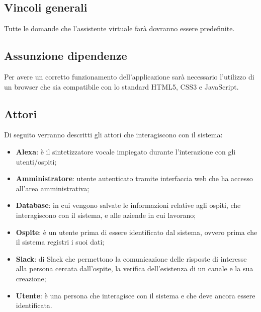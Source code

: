 \documentclass[../AnalisiDeiRequisiti.tex]{subfiles}
\begin{document}
	\subsection{Vincoli generali}
	Tutte le domande che l'assistente virtuale farà dovranno essere predefinite.
	\subsection{Assunzione dipendenze}
	Per avere un corretto funzionamento dell'applicazione sarà necessario l'utilizzo di un browser che sia compatibile con lo standard HTML5, CSS3 e JavaScript.
	\subsection{Attori}
	Di seguito verranno descritti gli attori che interagiscono con il sistema:
	\begin{itemize}
		\item \textbf{Alexa}: è il sintetizzatore vocale impiegato durante l'interazione con gli utenti/ospiti;
		\item \textbf{Amministratore}: utente autenticato tramite interfaccia web che ha accesso all'area amministrativa;
		\item \textbf{Database}:  in cui vengono salvate le informazioni relative agli ospiti, che interagiscono con il sistema, e alle aziende in cui lavorano;
		\item \textbf{Ospite}: è un utente prima di essere identificato dal sistema, ovvero prima che il sistema registri i suoi dati;
		\item \textbf{Slack}:  di Slack che permettono la comunicazione delle risposte di interesse alla persona cercata dall'ospite, la verifica dell'esistenza di un canale e la sua creazione;
		\item \textbf{Utente}: è una persona che interagisce con il sistema e che deve ancora essere identificata.
	\end{itemize}
\end{document}
